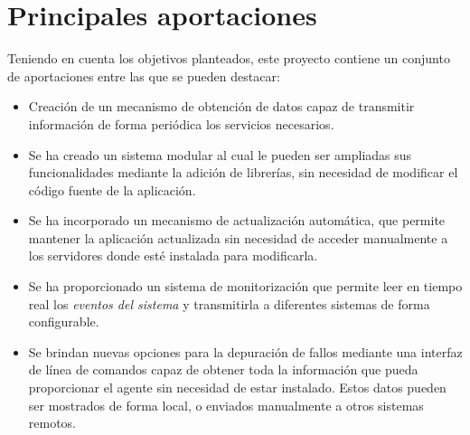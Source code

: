 \label{sec:conc}
\section{Principales aportaciones}
Teniendo en cuenta los objetivos planteados, este proyecto contiene un conjunto de aportaciones entre las que se pueden destacar:

\begin{itemize}
    \item Creación de un mecanismo de obtención de datos capaz de transmitir información de forma periódica los servicios necesarios.
    
    \item Se ha creado un sistema modular al cual le pueden ser ampliadas sus funcionalidades mediante la adición de librerías, sin necesidad de modificar el código fuente de la aplicación.
    
    \item Se ha incorporado un mecanismo de actualización automática, que permite mantener la aplicación actualizada sin necesidad de acceder manualmente a los servidores donde esté instalada para modificarla.
    
    \item Se ha proporcionado un sistema de monitorización que permite leer en tiempo real los \textit{eventos del sistema} y transmitirla a diferentes sistemas de forma configurable.
    
    \item Se brindan nuevas opciones para la depuración de fallos mediante una interfaz de línea de comandos capaz de obtener toda la información que pueda proporcionar el agente sin necesidad de estar instalado. Estos datos pueden ser mostrados de forma local, o enviados manualmente a otros sistemas remotos.
\end{itemize}





